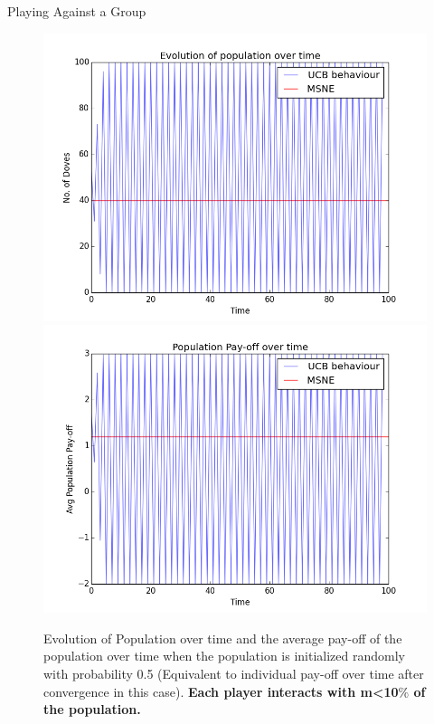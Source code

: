 \documentclass{IFES-beamer}
\begin{document}
        \begin{frame}{Playing Against a Group}
             \begin{figure}
                \centering
                \includegraphics[scale=0.25]{Images/UCB/Population/mini_100_100_epochs.png}
                \includegraphics[scale=0.25]{Images/UCB/Pay-off/pay-off_mini_100_100_epochs.png}
                \caption{Evolution of Population over time and the average pay-off of the population over time when the population is initialized randomly with probability 0.5 (Equivalent to individual pay-off over time after convergence in this case). \textbf{Each player interacts with m<10$\%$ of the population.}}
                \label{fig:my_label}
            \end{figure}
        \end{frame}
        
\end{document}
